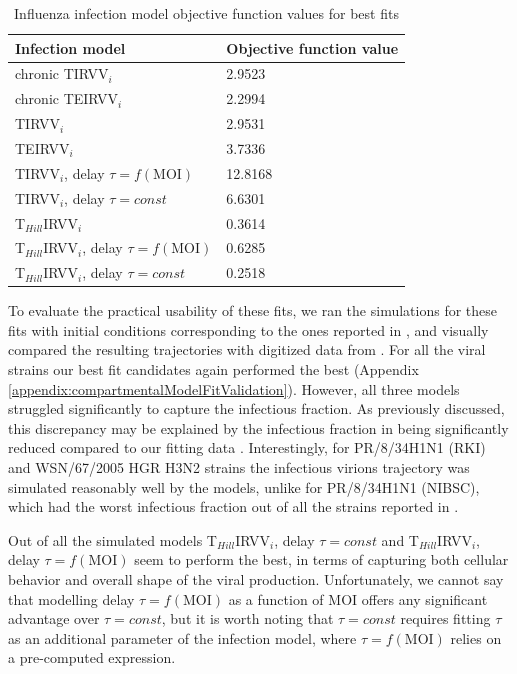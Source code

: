 \begin{table}[h!]
\centering
\caption[Influenza infection model objective function values for best fits]{Influenza infection model objective function values for best fits}
\label{table:ModelObjFunction}

\begin{tabular}{p{8cm} p{3cm}}
\hline 
\textbf{Infection model} & \textbf{Objective function value}\\
\hline
chronic TIRVV$_i$ & 2.9523\\
chronic TEIRVV$_i$ & 2.2994\\
\hline
TIRVV$_i$ & 2.9531\\
TEIRVV$_i$ &  3.7336\\
TIRVV$_i$, delay $\tau = f(\text{MOI})$ & 12.8168\\
TIRVV$_i$, delay $\tau = const$ & 6.6301\\
T$_{Hill}$IRVV$_i$ & 0.3614\\
T$_{Hill}$IRVV$_i$, delay $\tau = f(\text{MOI})$ & 0.6285\\
T$_{Hill}$IRVV$_i$, delay $\tau = const$ & 0.2518\\
\hline
\end{tabular}
\end{table}

To evaluate the practical usability of these fits, we ran the simulations for these fits with initial conditions corresponding to the ones reported in \cite{schulze2009infection}, and visually compared the resulting trajectories with digitized data from \cite{schulze2009infection}. For all the viral strains our best fit candidates again performed the best (Appendix \ref{appendix:compartmentalModelFitValidation}). However, all three models struggled significantly to capture the infectious fraction. As previously discussed, this discrepancy may be explained by the infectious fraction in \cite{schulze2009infection} being significantly reduced compared to our fitting data \cite{rudiger2019multiscale}. Interestingly, for PR/8/34H1N1 (RKI) and WSN/67/2005 HGR H3N2 strains the infectious virions trajectory was simulated reasonably well by the models, unlike for PR/8/34H1N1 (NIBSC), which had the worst infectious fraction out of all the strains reported in \cite{schulze2009infection}.

Out of all the simulated models T$_{Hill}$IRVV$_i$, delay $\tau = const$ and T$_{Hill}$IRVV$_i$, delay $\tau = f(\text{MOI})$ seem to perform the best, in terms of capturing both cellular behavior and overall shape of the viral production. Unfortunately, we cannot say that modelling delay $\tau = f(\text{MOI})$ as a function of MOI offers any significant advantage over $\tau = const$, but it is worth noting that $\tau = const$ requires fitting $\tau$ as an additional parameter of the infection model, where $\tau = f(\text{MOI})$ relies on a pre-computed expression.

